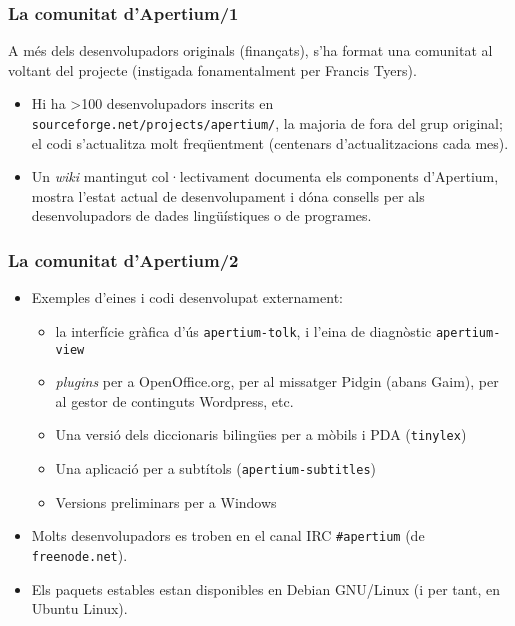 \documentclass{beamer}
\newcommand{\empha}[1]{\emph{#1}\/}
\begin{document}
\begin{frame}
\frametitle{La comunitat d'Apertium/1}
A més dels desenvolupadors originals (finançats), s'ha format una comunitat al voltant del projecte (instigada fonamentalment per Francis Tyers).
\begin{itemize}
\item Hi ha >100 desenvolupadors inscrits en
  \texttt{sourceforge.net/projects/apertium/}, la majoria de fora del grup
  original; el codi s'actualitza molt freqüentment (centenars
  d'actualitzacions cada mes).
\item Un \empha{wiki} mantingut col·lectivament documenta els components d'Apertium, mostra l'estat actual de desenvolupament i dóna consells per als desenvolupadors de dades lingüístiques o de programes.
\end{itemize}
\end{frame}
\begin{frame}
\frametitle{La comunitat d'Apertium/2}
\begin{itemize}

\item Exemples d'eines i codi desenvolupat externament: 
  \begin{itemize}
  \item la interfície gràfica d'ús \texttt{apertium-tolk}, i l'eina de diagnòstic \texttt{apertium-view}
   \item \empha{plugins} per a OpenOffice.org, per al missatger Pidgin (abans Gaim), per al gestor de continguts Wordpress, etc.
   \item Una versió dels diccionaris bilingües per a mòbils i PDA (\texttt{tinylex})
   \item Una aplicació per a subtítols (\texttt{apertium-subtitles})
   \item Versions preliminars per a Windows
  \end{itemize}
\item Molts desenvolupadors es troben en el canal IRC \texttt{\#apertium} (de \texttt{freenode.net}).
\item Els paquets estables estan disponibles en Debian GNU/Linux (i per tant, en Ubuntu Linux).
\end{itemize}
\end{frame}
\end{document}
